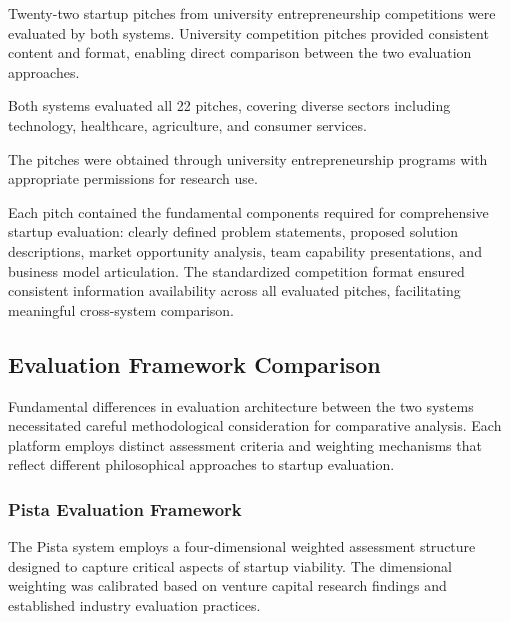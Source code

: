 Twenty-two startup pitches from university entrepreneurship competitions were evaluated by both systems. University competition pitches provided consistent content and format, enabling direct comparison between the two evaluation approaches.

Both systems evaluated all 22 pitches, covering diverse sectors including technology, healthcare, agriculture, and consumer services.

The pitches were obtained through university entrepreneurship programs with appropriate permissions for research use.

Each pitch contained the fundamental components required for comprehensive startup evaluation: clearly defined problem statements, proposed solution descriptions, market opportunity analysis, team capability presentations, and business model articulation. The standardized competition format ensured consistent information availability across all evaluated pitches, facilitating meaningful cross-system comparison.

\subsection{Evaluation Framework Comparison}
\label{subsec:frameworks}

Fundamental differences in evaluation architecture between the two systems necessitated careful methodological consideration for comparative analysis. Each platform employs distinct assessment criteria and weighting mechanisms that reflect different philosophical approaches to startup evaluation.

\subsubsection{Pista Evaluation Framework}

The Pista system employs a four-dimensional weighted assessment structure designed to capture critical aspects of startup viability. The dimensional weighting was calibrated based on venture capital research findings and established industry evaluation practices.

